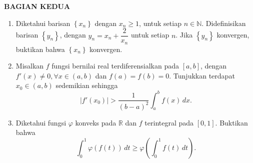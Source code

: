 \documentclass[12pt,twoside]{article}
\begin{document}
\newpage
\newpage \textbf{BAGIAN KEDUA}
\begin{enumerate}
	\item Diketahui barisan $\left\lbrace x_n \right\rbrace$ dengan $x_n \geq 1$, untuk setiap $n \in \mathbb{N}$. Didefinisikan barisan $\left\lbrace y_n \right\rbrace$, dengan $y_n = x_n + \dfrac{2}{x_n}$ untuk setiap $n$. Jika $\left\lbrace y_n \right\rbrace$ konvergen, buktikan bahwa $\left\lbrace x_n \right\rbrace$ konvergen.

	\item Misalkan $f$ fungsi bernilai real terdiferensialkan pada $[a,b]$, dengan $f'(x) \neq 0, \forall x \in (a,b)$ dan $f(a)=f(b)=0$. Tunjukkan terdapat $x_0 \in (a,b)$ sedemikian sehingga
	      \begin{equation*}
		      |f'(x_0)| > \displaystyle \dfrac{1}{(b-a)^2} \int_{a}^{b} f(x)\,dx.
	      \end{equation*}

	\item Diketahui fungsi $\varphi$ konveks pada $\mathbb{R}$ dan $f$ terintegral pada $[0,1]$. Buktikan bahwa
	      \begin{equation*}
		      \displaystyle\int_{0}^{1} \varphi(f(t)) \, dt \geq \varphi \left( \int_{0}^{1} f(t)\,dt \right).
	      \end{equation*}
\end{enumerate}

\pagebreak
\end{document}
